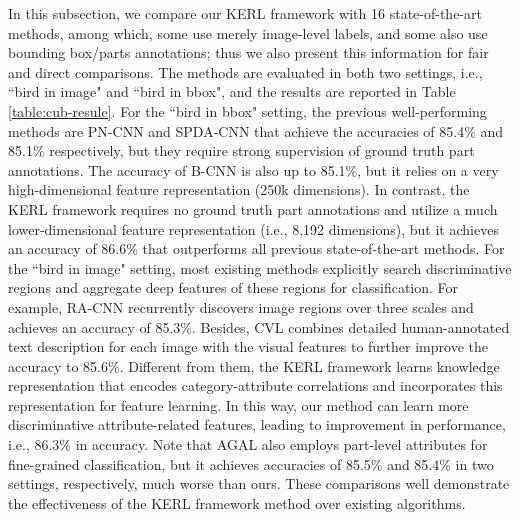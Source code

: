 \documentclass{article}
\begin{document}
In this subsection, we compare our KERL framework with 16 state-of-the-art methods, among which, some use merely image-level labels, and some also use bounding box/parts annotations; thus we also present this information for fair and direct comparisons. The methods are evaluated in both two settings, i.e., ``bird in image" and ``bird in bbox", and the results are reported in Table \ref{table:cub-resule}. 
For the ``bird in bbox" setting, the previous well-performing methods are PN-CNN and SPDA-CNN that achieve the accuracies of 85.4\% and 85.1\% respectively, but they require strong supervision of ground truth part annotations. The accuracy of B-CNN is also up to 85.1\%, but it relies on a very high-dimensional feature representation (250k dimensions). In contrast, the KERL framework requires no ground truth part annotations and utilize a much lower-dimensional feature representation (i.e., 8,192 dimensions), but it achieves an accuracy of 86.6\% that outperforms all previous state-of-the-art methods. 
For the ``bird in image" setting, most existing methods explicitly search discriminative regions and aggregate deep features of these regions for classification. For example, RA-CNN recurrently discovers image regions over three scales and achieves an accuracy of 85.3\%. Besides, CVL combines detailed human-annotated text description for each image with the visual features to further improve the accuracy to 85.6\%. Different from them, the KERL framework learns knowledge representation that encodes category-attribute correlations and incorporates this representation for feature learning. In this way, our method can learn more discriminative attribute-related features, leading to improvement in performance, i.e., 86.3\% in accuracy. Note that AGAL also employs part-level attributes for fine-grained classification, but it achieves accuracies of 85.5\% and 85.4\% in two settings, respectively, much worse than ours. These comparisons well demonstrate the effectiveness of the KERL framework method over existing algorithms. 
\end{document}
